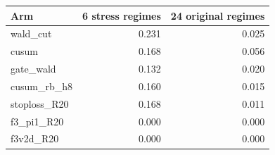 \begin{tabular}{@{}l r r@{}}
\toprule
Arm & 6 stress regimes & 24 original regimes \\
\midrule
wald\_cut & 0.231 & 0.025 \\
cusum & 0.168 & 0.056 \\
gate\_wald & 0.132 & 0.020 \\
cusum\_rb\_h8 & 0.160 & 0.015 \\
stoploss\_R20 & 0.168 & 0.011 \\
f3\_pi1\_R20 & 0.000 & 0.000 \\
f3v2d\_R20 & 0.000 & 0.000 \\
\bottomrule
\end{tabular}
